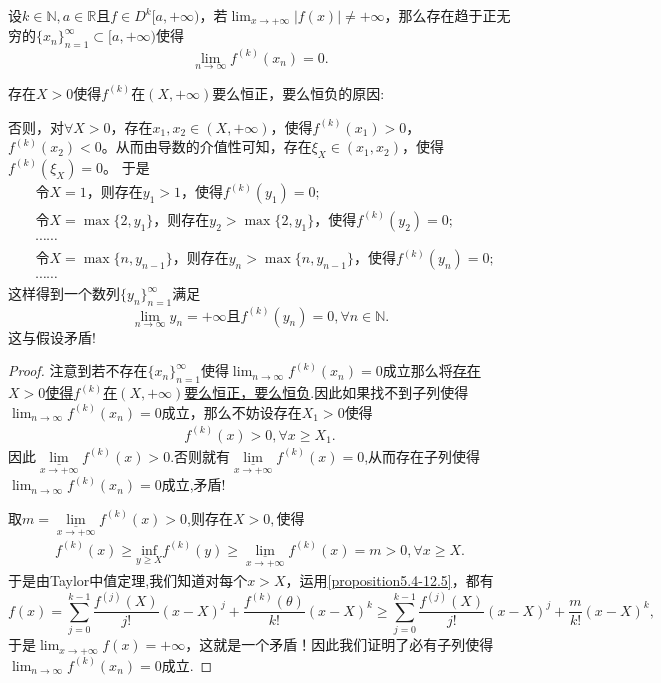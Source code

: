 \documentclass[../../main.tex]{subfiles}
\begin{document}
\begin{proposition}\label{proposition:函数不爆破则各阶导数必然有趋于 0 的子列}
设\(k\in\mathbb{N},a\in\mathbb{R}\)且\(f\in D^{k}[a,+\infty)\)，若\(\lim_{x\rightarrow +\infty}|f(x)|\neq +\infty\)，那么存在趋于正无穷的\(\{x_n\}_{n = 1}^{\infty}\subset [a,+\infty)\)使得
\[
\lim_{n\rightarrow\infty}f^{(k)}(x_n)=0.
\]
\end{proposition}
\begin{note}
\hypertarget{proposition5.4由假设得到这个结论的原因}{存在\(X > 0\)使得\(f^{(k)}\)在\((X,+\infty)\)要么恒正，要么恒负的原因:}否则，对\(\forall X>0\)，存在\(x_1,x_2\in (X,+\infty)\)，使得\(f^{(k)}(x_1)>0\)，\(f^{(k)}(x_2)<0\)。从而由导数的介值性可知，存在\(\xi_X\in (x_1,x_2)\)，使得\(f^{(k)}(\xi_X) = 0\)。
于是
\begin{align*}
&\text{令}X = 1\text{，则存在}y_1>1\text{，使得}f^{(k)}(y_1)=0;\\
&\text{令}X=\max\{2,y_1\}\text{，则存在}y_2>\max\{2,y_1\}\text{，使得}f^{(k)}(y_2)=0;\\
&\cdots\cdots\\
&\text{令}X=\max\{n,y_{n - 1}\}\text{，则存在}y_n>\max\{n,y_{n - 1}\}\text{，使得}f^{(k)}(y_n)=0;\\
&\cdots\cdots
\end{align*}
这样得到一个数列\(\{y_n\}_{n = 1}^{\infty}\)满足
\[
\lim_{n\rightarrow \infty}y_n=+\infty\text{且}f^{(k)}(y_n)=0,\forall n\in \mathbb{N}.
\]
这与假设矛盾!
\end{note}
\begin{proof}
注意到若不存在\(\{x_n\}_{n = 1}^{\infty}\)使得\(\lim_{n\rightarrow\infty}f^{(k)}(x_n)=0\)成立那么将\hyperlink{proposition5.4由假设得到这个结论的原因}{存在\(X > 0\)使得\(f^{(k)}\)在\((X,+\infty)\)要么恒正，要么恒负}.因此如果找不到子列使得\(\lim_{n\rightarrow\infty}f^{(k)}(x_n)=0\)成立，那么不妨设存在\(X_1> 0\)使得
\begin{align*}
f^{(k)}(x)>0,\forall x\geqslant X_1.
\end{align*}
因此$\underset{x\rightarrow +\infty}{\underline{\lim }}f^{(k)}\left( x \right) >0.$否则就有$\underset{x\rightarrow +\infty}{\underline{\lim }}f^{(k)}\left( x \right) =0$,从而存在子列使得\(\lim_{n\rightarrow\infty}f^{(k)}(x_n)=0\)成立,矛盾!

取$m=\underset{x\rightarrow +\infty}{\underline{\lim }}f^{(k)}\left( x \right) >0$,则存在$X>0,$使得
\begin{align}\label{proposition5.4-12.5}
f^{(k)}(x)\geqslant \underset{y\geqslant X}{\mathrm{inf}}f^{(k)}\left( y \right) \geqslant \underset{x\rightarrow +\infty}{\underline{\lim }}f^{(k)}\left( x \right) =m>0,\forall x\geqslant X.
\end{align}
于是由Taylor中值定理,我们知道对每个\(x > X\)，运用\eqref{proposition5.4-12.5}，都有
\[f(x)=\sum_{j = 0}^{k - 1}\frac{f^{(j)}(X)}{j!}(x - X)^j+\frac{f^{(k)}(\theta)}{k!}(x - X)^k\geqslant\sum_{j = 0}^{k - 1}\frac{f^{(j)}(X)}{j!}(x - X)^j+\frac{m}{k!}(x - X)^k,\]
于是\(\lim_{x\rightarrow +\infty}f(x)=+\infty\)，这就是一个矛盾！因此我们证明了必有子列使得\(\lim_{n\rightarrow\infty}f^{(k)}(x_n)=0\)成立.

\end{proof}
\end{document}
